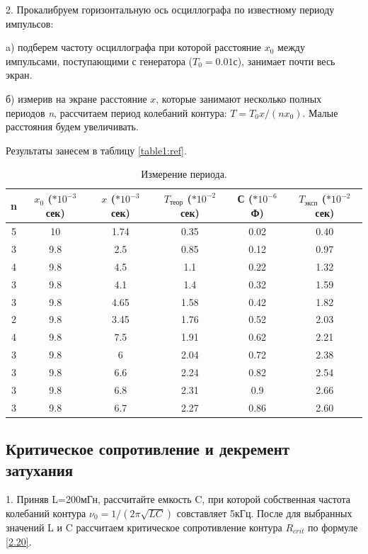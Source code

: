 \documentclass[a4paper,12pt]{article} %
\begin{document}
2. Прокалибруем горизонтальную ось осциллографа по известному периоду импульсов:

a) подберем частоту осциллографа при которой расстояние $x_0$ между импульсами, поступающими с генератора ($T_0 = 0.01$с), занимает почти весь экран.

б) измерив на экране расстояние $x$, которые занимают несколько полных периодов \textit{n}, рассчитаем период колебаний контура: $T = T_0x/(nx_0)$. Малые расстояния будем увеличивать.

Результаты занесем в таблицу \eqref{table1:ref}.

\begin{table}[H]
\caption{\label{tab:canonsummary} Измерение периода.}
\begin{center}
\begin{tabular}{|c|c|c|c|c|c|}
\hline
n & $x_0$ ($*10^{-3}$сек) & $x$ ($*10^{-3}$сек) & $T_\text{теор}$ ($* 10^{-2}$сек) & С ($*10^{-6}$Ф)&$T_\text{эксп}$ ($* 10^{-2}$сек)\\
\hline
5 & 10 & 1.74 & 0.35 &0.02 & 0.40\\
\hline
3 & 9.8 & 2.5 & 0.85 &0.12 & 0.97\\
\hline
4 & 9.8 & 4.5 & 1.1 &0.22 & 1.32\\
\hline
3 & 9.8 & 4.1 & 1.4 &0.32 & 1.59\\
\hline
3 & 9.8 & 4.65 & 1.58 &0.42 & 1.82\\
\hline
2 & 9.8 & 3.45 & 1.76 &0.52 & 2.03\\
\hline
4 & 9.8 & 7.5 & 1.91 &0.62 & 2.21\\
\hline
3 & 9.8 & 6 & 2.04 &0.72 & 2.38\\
\hline
3 & 9.8 & 6.6 & 2.24 &0.82 & 2.54\\
\hline
3 & 9.8 & 6.8 & 2.31 &0.9 & 2.66\\
\hline
3 & 9.8 & 6.7 & 2.27 &0.86 & 2.60\\
\hline
\end{tabular}
\end{center}
\label{table1:ref}
\end{table}

\subsection{Критическое сопротивление и декремент затухания}

1. Приняв L=200мГн, рассчитайте емкость C, при которой собственная частота колебаний контура $\nu_0 = 1/(2\pi\sqrt{LC})$ совставляет 5кГц. После для выбранных значений L и C рассчитаем критическое сопротивление контура $R_{crit}$ по формуле \eqref{2.20}.
\end{document}
